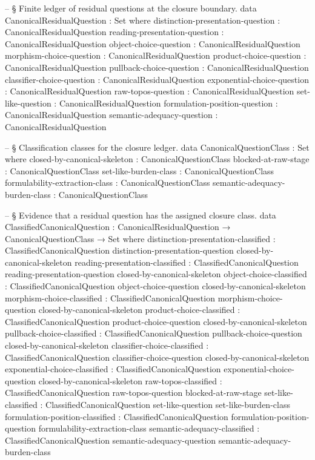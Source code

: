 \documentclass[11pt]{article}
\begin{document}
\begin{code}
-- § Finite ledger of residual questions at the closure boundary.
data CanonicalResidualQuestion : Set where
  distinction-presentation-question : CanonicalResidualQuestion
  reading-presentation-question     : CanonicalResidualQuestion
  object-choice-question            : CanonicalResidualQuestion
  morphism-choice-question          : CanonicalResidualQuestion
  product-choice-question           : CanonicalResidualQuestion
  pullback-choice-question          : CanonicalResidualQuestion
  classifier-choice-question        : CanonicalResidualQuestion
  exponential-choice-question       : CanonicalResidualQuestion
  raw-topos-question                : CanonicalResidualQuestion
  set-like-question                 : CanonicalResidualQuestion
  formulation-position-question     : CanonicalResidualQuestion
  semantic-adequacy-question        : CanonicalResidualQuestion

-- § Classification classes for the closure ledger.
data CanonicalQuestionClass : Set where
  closed-by-canonical-skeleton : CanonicalQuestionClass
  blocked-at-raw-stage         : CanonicalQuestionClass
  set-like-burden-class        : CanonicalQuestionClass
  formulability-extraction-class : CanonicalQuestionClass
  semantic-adequacy-burden-class : CanonicalQuestionClass

-- § Evidence that a residual question has the assigned closure class.
data ClassifiedCanonicalQuestion :
  CanonicalResidualQuestion → CanonicalQuestionClass → Set where
  distinction-presentation-classified :
    ClassifiedCanonicalQuestion
      distinction-presentation-question
      closed-by-canonical-skeleton
  reading-presentation-classified :
    ClassifiedCanonicalQuestion
      reading-presentation-question
      closed-by-canonical-skeleton
  object-choice-classified :
    ClassifiedCanonicalQuestion
      object-choice-question
      closed-by-canonical-skeleton
  morphism-choice-classified :
    ClassifiedCanonicalQuestion
      morphism-choice-question
      closed-by-canonical-skeleton
  product-choice-classified :
    ClassifiedCanonicalQuestion
      product-choice-question
      closed-by-canonical-skeleton
  pullback-choice-classified :
    ClassifiedCanonicalQuestion
      pullback-choice-question
      closed-by-canonical-skeleton
  classifier-choice-classified :
    ClassifiedCanonicalQuestion
      classifier-choice-question
      closed-by-canonical-skeleton
  exponential-choice-classified :
    ClassifiedCanonicalQuestion
      exponential-choice-question
      closed-by-canonical-skeleton
  raw-topos-classified :
    ClassifiedCanonicalQuestion raw-topos-question blocked-at-raw-stage
  set-like-classified :
    ClassifiedCanonicalQuestion set-like-question set-like-burden-class
  formulation-position-classified :
    ClassifiedCanonicalQuestion
      formulation-position-question
      formulability-extraction-class
  semantic-adequacy-classified :
    ClassifiedCanonicalQuestion
      semantic-adequacy-question
      semantic-adequacy-burden-class


\end{code}
\end{document}
